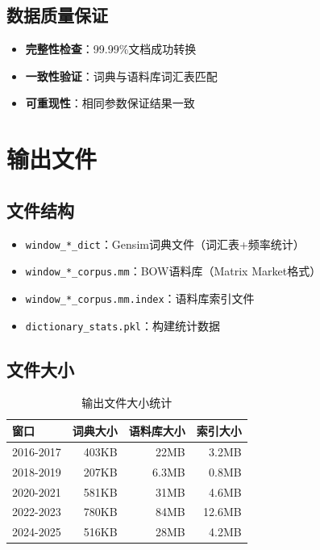 \documentclass[11pt,a4paper]{article}
\begin{document}
\subsection{数据质量保证}

\begin{itemize}
    \item \textbf{完整性检查}：99.99\%文档成功转换
    \item \textbf{一致性验证}：词典与语料库词汇表匹配
    \item \textbf{可重现性}：相同参数保证结果一致
\end{itemize}

\section{输出文件}

\subsection{文件结构}

\begin{itemize}
    \item \texttt{window\_*\_dict}：Gensim词典文件（词汇表+频率统计）
    \item \texttt{window\_*\_corpus.mm}：BOW语料库（Matrix Market格式）
    \item \texttt{window\_*\_corpus.mm.index}：语料库索引文件
    \item \texttt{dictionary\_stats.pkl}：构建统计数据
\end{itemize}

\subsection{文件大小}

\begin{table}[h]
\centering
\begin{tabular}{lrrr}
\toprule
\textbf{窗口} & \textbf{词典大小} & \textbf{语料库大小} & \textbf{索引大小} \\
\midrule
2016-2017 & 403KB & 22MB & 3.2MB \\
2018-2019 & 207KB & 6.3MB & 0.8MB \\
2020-2021 & 581KB & 31MB & 4.6MB \\
2022-2023 & 780KB & 84MB & 12.6MB \\
2024-2025 & 516KB & 28MB & 4.2MB \\
\bottomrule
\end{tabular}
\caption{输出文件大小统计}
\end{table}
\end{document}
